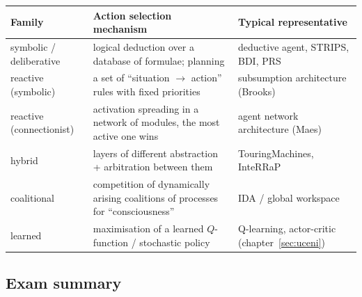 \documentclass[11pt,a4paper]{article}
\theoremstyle{definition}
\providecommand{\uv}[1]{``#1''}
\begin{document}
\begin{center}
\small
\begin{tabular}{p{} p{} p{}}
\toprule
\textbf{Family} & \textbf{Action selection mechanism} & \textbf{Typical representative} \\
\midrule
symbolic / deliberative
  & logical deduction over a database of formulae; planning
  & deductive agent, STRIPS, BDI, PRS \\
reactive (symbolic)
  & a set of \uv{situation $\to$ action} rules with fixed priorities
  & subsumption architecture (Brooks) \\
reactive (connectionist)
  & activation spreading in a network of modules, the most active one wins
  & agent network architecture (Maes) \\
hybrid
  & layers of different abstraction + arbitration between them
  & TouringMachines, InteRRaP \\
coalitional
  & competition of dynamically arising coalitions of processes for \uv{consciousness}
  & IDA / global workspace \\
learned
  & maximisation of a learned $Q$-function / stochastic policy
  & Q-learning, actor-critic (chapter~\ref{sec:uceni}) \\
\bottomrule
\end{tabular}
\end{center}


\subsection{Exam summary}
\end{document}
